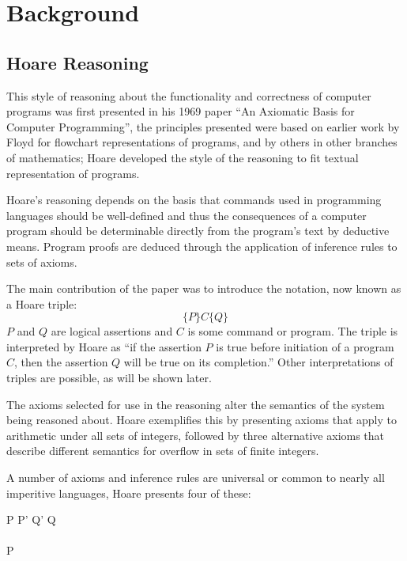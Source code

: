 \documentclass[a4paper]{report}
\begin{document}

\chapter{Background}
\section{Hoare Reasoning}
  This style of reasoning about the functionality and correctness of computer
  programs was first presented in his 1969 paper ``An Axiomatic Basis for
  Computer Programming''\cite{Hoare1969Axiom}, the principles presented were
  based on earlier work by Floyd\cite{floyd1967assigning} for flowchart
  representations of programs, and by others in other branches of mathematics;
  Hoare developed the style of the reasoning to fit textual representation of
  programs.

  Hoare's reasoning depends on the basis that commands used in programming
  languages should be well-defined and thus the consequences of a computer
  program should be determinable directly from the program's text by deductive
  means. Program proofs are deduced through the application of inference rules
  to sets of axioms.

  The main contribution of the paper was to introduce the notation, now known as
  a Hoare triple:
    \[ \{P\} C \{Q\} \]
  $P$ and $Q$ are logical assertions and $C$ is some command or program. The
  triple is interpreted by Hoare as ``if the assertion $P$ is true before
  initiation of a program $C$, then the assertion $Q$ will be true on its
  completion.'' Other interpretations of triples are possible, as will be shown
  later.

  The axioms selected for use in the reasoning alter the semantics of the system
  being reasoned about. Hoare exemplifies this by presenting axioms that apply
  to arithmetic under all sets of integers, followed by three alternative axioms
  that describe different semantics for overflow in sets of finite integers.

  A number of axioms and inference rules are universal or common to nearly all
  imperitive languages, Hoare presents four of these:
  \begin{display}{}
    {} \qquad

    { \quad P \impl P' \quad Q' \impl Q}
    {} \\
    \\
    {P \quad {}}
    {} \qquad

    { \quad {}}
    {}
  \end{display}
\end{document}
